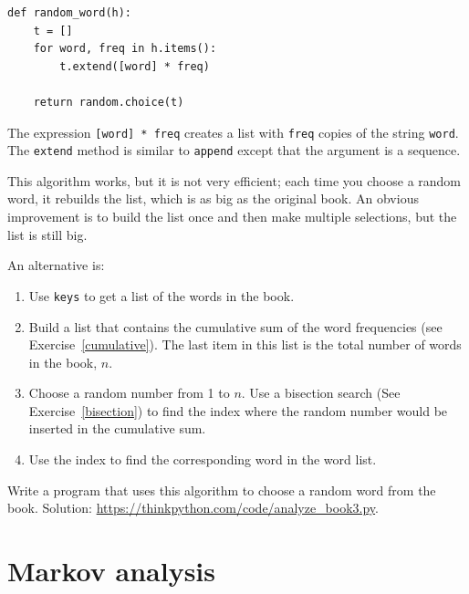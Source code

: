 \documentclass[10pt]{book}
\begin{document}
\begin{verbatim}
def random_word(h):
    t = []
    for word, freq in h.items():
        t.extend([word] * freq)

    return random.choice(t)
\end{verbatim}
%
The expression {\tt [word] * freq} creates a list with {\tt freq}
copies of the string {\tt word}.  The {\tt extend}
method is similar to {\tt append} except that the argument is
a sequence.

This algorithm works, but it is not very efficient; each time you
choose a random word, it rebuilds the list, which is as big as
the original book.  An obvious improvement is to build the list
once and then make multiple selections, but the list is still big.

An alternative is:

\begin{enumerate}

\item Use {\tt keys} to get a list of the words in the book.

\item Build a list that contains the cumulative sum of the word
  frequencies (see Exercise~\ref{cumulative}).  The last item
  in this list is the total number of words in the book, $n$.

\item Choose a random number from 1 to $n$.  Use a bisection search
  (See Exercise~\ref{bisection}) to find the index where the random
  number would be inserted in the cumulative sum.

\item Use the index to find the corresponding word in the word list.

\end{enumerate}

\begin{exercise}
\label{randhist}

Write a program that uses this algorithm to choose a random word from
the book.  Solution:
\url{https://thinkpython.com/code/analyze_book3.py}.

\end{exercise}



\section{Markov analysis}
\label{markov}
\end{document}
